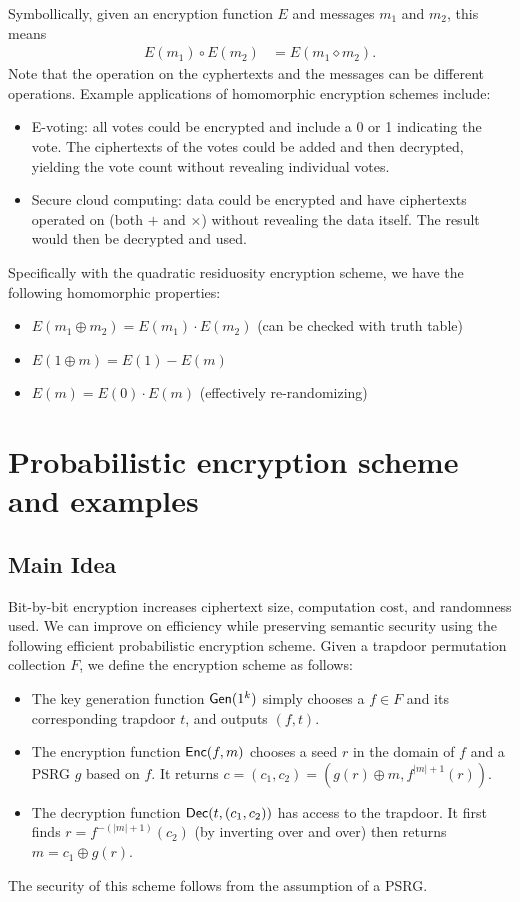 \documentclass[10pt]{article}
\begin{document}
Symbollically, given an encryption function $E$ and messages $m_1$ and $m_2$, this means
\begin{align*}
E(m_1) \circ E(m_2) &= E(m_1 \diamond m_2).
\end{align*}
Note that the operation on the cyphertexts and the messages can be different operations. Example applications of homomorphic encryption schemes include:
\begin{itemize}
	\item E-voting: all votes could be encrypted and include a 0 or 1 indicating the vote. The ciphertexts of the votes could be added and then decrypted, yielding the vote count without revealing individual votes.
	\item Secure cloud computing: data could be encrypted and have ciphertexts operated on (both $+$ and $\times$) without revealing the data itself. The result would then be decrypted and used.
\end{itemize}
Specifically with the quadratic residuosity encryption scheme, we have the following homomorphic properties:
\begin{itemize}
	\item $E(m_1 \oplus m_2) = E(m_1) \cdot E(m_2)$ (can be checked with truth table)
	\item $E(1 \oplus m) = E(1) - E(m)$
	\item $E(m) = E(0) \cdot E(m)$ (effectively re-randomizing)
\end{itemize}





\section{Probabilistic encryption scheme and examples}

\subsection{Main Idea}

Bit-by-bit encryption increases ciphertext size, computation cost, and randomness used. We can improve on efficiency while preserving semantic security using the following efficient probabilistic encryption scheme. Given a trapdoor permutation collection $F$, we define the encryption scheme as follows:
\begin{itemize}
	\item The key generation function $\mathsf{Gen}(1^k)$ simply chooses a $f\in F$ and its corresponding trapdoor $t$, and outputs $(f, t)$.
	\item The encryption function $\mathsf{Enc}(f, m)$ chooses a seed $r$ in the domain of $f$ and a PSRG $g$ based on $f$. It returns $c = (c_1, c_2) = (g(r)\oplus m, f^{|m|+1}(r))$.
	\item The decryption function $\mathsf{Dec}(t, (c_1, c_2))$ has access to the trapdoor. It first finds $r = f^{-(|m|+1)}(c_2)$ (by inverting over and over) then returns $m=c_1 \oplus g(r)$.
\end{itemize}
The security of this scheme follows from the assumption of a PSRG. \cite{BG}
\end{document}
